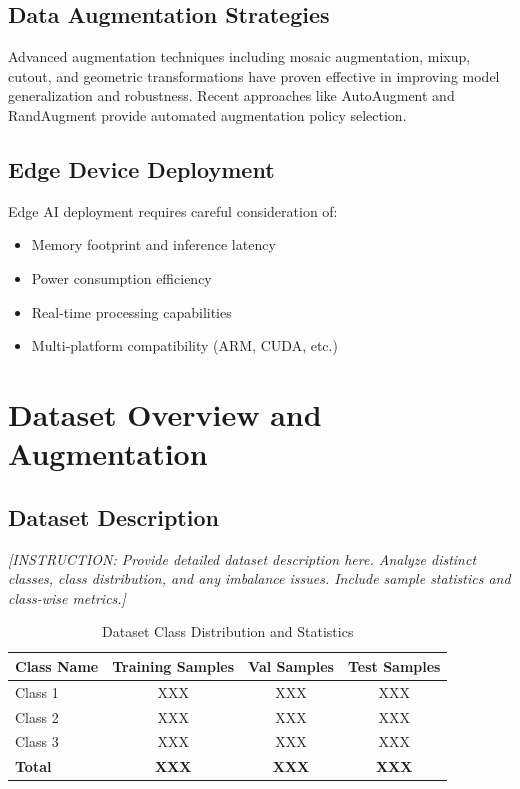 \documentclass[11pt,a4paper]{article}
\begin{document}
\subsection{Data Augmentation Strategies}

Advanced augmentation techniques including mosaic augmentation, mixup, cutout, and geometric transformations 
have proven effective in improving model generalization and robustness. Recent approaches like AutoAugment 
and RandAugment provide automated augmentation policy selection.

\subsection{Edge Device Deployment}

Edge AI deployment requires careful consideration of:
\begin{itemize}
    \item Memory footprint and inference latency
    \item Power consumption efficiency
    \item Real-time processing capabilities
    \item Multi-platform compatibility (ARM, CUDA, etc.)
\end{itemize}


\section{Dataset Overview and Augmentation}
\label{sec:dataset}

\subsection{Dataset Description}

\textit{[INSTRUCTION: Provide detailed dataset description here. Analyze distinct classes, class distribution, 
and any imbalance issues. Include sample statistics and class-wise metrics.]}

\begin{table}[H]
    \centering
    \caption{Dataset Class Distribution and Statistics}
    \label{tab:dataset_stats}
    \begin{tabular}{|l|c|c|c|}
    \hline
    \textbf{Class Name} & \textbf{Training Samples} & \textbf{Val Samples} & \textbf{Test Samples} \\
    \hline
    Class 1 & XXX & XXX & XXX \\
    Class 2 & XXX & XXX & XXX \\
    Class 3 & XXX & XXX & XXX \\
    \hline
    \textbf{Total} & \textbf{XXX} & \textbf{XXX} & \textbf{XXX} \\
    \hline
    \end{tabular}
\end{table}
\end{document}
